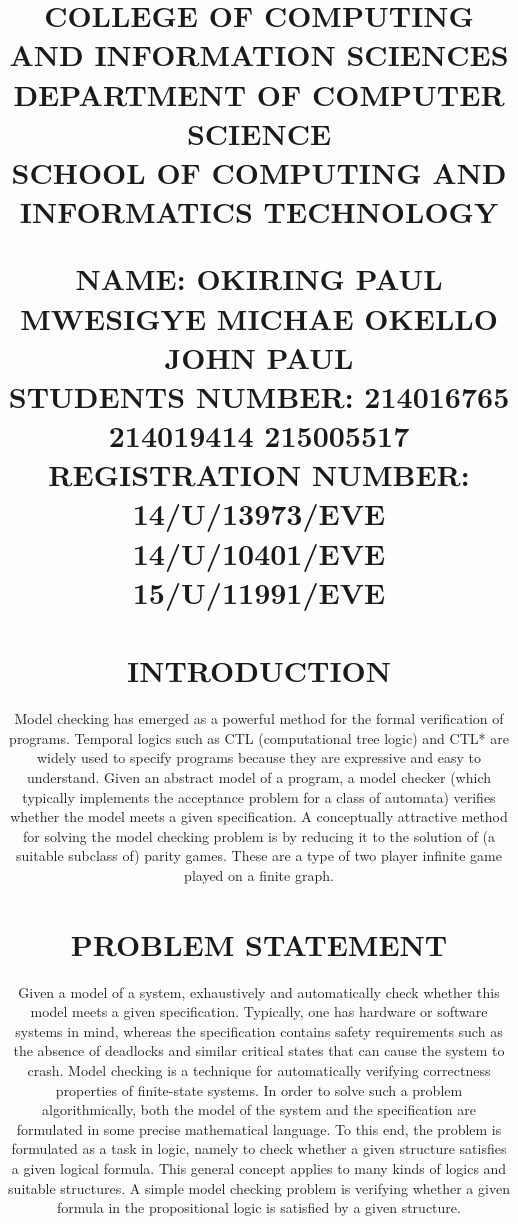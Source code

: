 \documentclass[12pt,letterpaper]{article}
\begin{document}
\title{COLLEGE OF COMPUTING AND INFORMATION SCIENCES\\ DEPARTMENT OF COMPUTER SCIENCE\\ SCHOOL OF COMPUTING AND INFORMATICS TECHNOLOGY\\}
\maketitle
\title{NAME:	      OKIRING PAUL                 MWESIGYE MICHAE          OKELLO JOHN PAUL\\
STUDENTS NUMBER:      214016765                    214019414                  215005517
REGISTRATION NUMBER:  14/U/13973/EVE               14/U/10401/EVE              15/U/11991/EVE
\maketitle

\section{INTRODUCTION}

     Model checking has emerged as a powerful method for the formal verification of programs. Temporal logics such as CTL (computational tree logic) and CTL* are widely used to specify programs because they are expressive and easy to understand. Given an abstract model of a program, a model checker (which typically implements the acceptance problem for a class of automata) verifies whether the model meets a given specification. A conceptually attractive method for solving the model checking problem is by reducing it to the solution of (a suitable subclass of) parity games. These are a type of two player infinite game played on a finite graph.
\section{PROBLEM STATEMENT}
Given a model of a system, exhaustively and automatically check whether this model meets a given specification. Typically, one has hardware or software systems in mind, whereas the specification contains safety requirements such as the absence of deadlocks and similar critical states that can cause the system to crash. Model checking is a technique for automatically verifying correctness properties of finite-state systems.
In order to solve such a problem algorithmically, both the model of the system and the specification are formulated in some precise mathematical language. To this end, the problem is formulated as a task in logic, namely to check whether a given structure satisfies a given logical formula. This general concept applies to many kinds of logics and suitable structures. A simple model checking problem is verifying whether a given formula in the propositional logic is satisfied by a given structure.

}
\end{document}
